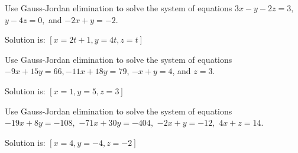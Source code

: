 \begin{enumialphparenastyle}
\begin{ex} Use Gauss-Jordan elimination to solve the system of equations $3x-y-2z=3,$ 
$y-4z=0,$ and $-2x+y=-2.$
\begin{sol}
Solution is: $\left[ x=2t+1,y=4t,z=t\right] $
\end{sol}
\end{ex}

\begin{ex} Use Gauss-Jordan elimination to solve the system of equations 
$-9x+15y=66,-11x+18y=79$, $-x+y=4$, and $z=3$.
\begin{sol}
Solution is: $\left[x=1,y=5,z=3\right] $
\end{sol}
\end{ex}

\begin{ex} Use Gauss-Jordan elimination to solve the system of equations $-19x+8y=-108,$
$-71x+30y=-404,$ $-2x+y=-12,$ $4x+z=14.$
\begin{sol}
Solution is: $\left[ x=4,y=-4,z=-2\right] $
\end{sol}
\end{ex}


\end{enumialphparenastyle}
